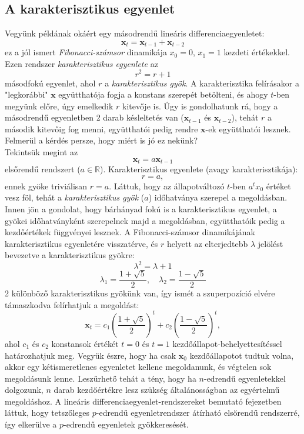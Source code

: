 \documentclass[14p]{article}
\begin{document}
\subsection{A karakterisztikus egyenlet}
Vegyünk példának okáért egy másodrendű lineáris differenciaegyenletet:
\[
	\pmb{x}_t = \pmb{x}_{t-1} + \pmb{x}_{t-2}
\]
ez a jól ismert \emph{Fibonacci-számsor} dinamikája $x_0 = 0$, $x_1 = 1$ kezdeti értékekkel.
Ezen rendszer \emph{karakterisztikus egyenlete} az
\[
	r^2 = r + 1
\]
másodfokú egyenlet, ahol $r$ a \emph{karakterisztikus gyök}. A karakterisztika felírásakor a "legkorábbi" $\pmb{x}$ együtthatója fogja a konstans szerepét betölteni, és ahogy $t$-ben megyünk előre, úgy emelkedik $r$ kitevője is. Úgy is gondolhatunk rá, hogy a másodrendű egyenletben 2 darab késleltetés van ($\pmb{x}_{t-1}$ és $\pmb{x}_{t-2}$), tehát $r$ a második kitevőig fog menni, együtthatói pedig rendre $\pmb{x}$-ek együtthatói lesznek. Felmerül a kérdés persze, hogy miért is jó ez nekünk?
\\
Tekintsük megint az
\[
	\pmb{x}_t = a\pmb{x}_{t-1}
\]
elsőrendű rendszert ($a \in \mathbb{R}$). Karakterisztikus egyenlete (avagy karakterisztikája):
\[
	r = a,
\]
ennek gyöke triviálisan $r = a$. Láttuk, hogy az állapotváltozó $t$-ben $a^tx_0$ értéket vesz föl, tehát a \emph{karakterisztikus gyök} ($a$) időhatványa szerepel a megoldásban. Innen jön a gondolat, hogy bárhányad fokú is a karakterisztikus egyenlet, a gyökei időhatványként szerepelnek majd a megoldásban, együtthatóik pedig a kezdőértékek függvényei lesznek. A Fibonacci-számsor dinamikájának karakterisztikus egyenletére visszatérve, és $r$ helyett az elterjedtebb $\lambda$ jelölést bevezetve a karakterisztikus gyökre:
\[
	\lambda^2 = \lambda + 1
\]
\[
	\lambda_1 = \frac{1+\sqrt{5}}{2}, \quad \lambda_2 = \frac{1-\sqrt{5}}{2}
\]
2 különböző karakterisztikus gyökünk van, így ismét a szuperpozíció elvére támaszkodva felírhatjuk a megoldást:
\[
	\pmb{x}_t = c_1(\frac{1+\sqrt{5}}{2})^{t} + c_2(\frac{1-\sqrt{5}}{2})^{t},
\]
ahol $c_1$ és $c_2$ konstansok értékét $t=0$ és $t=1$ kezdőállapot-behelyettesítéssel határozhatjuk meg. Vegyük észre, hogy ha csak $\pmb{x}_0$ kezdőállapotot tudtuk volna, akkor egy kétismeretlenes egyenletet kellene megoldanunk, és végtelen sok megoldásunk lenne. Leszűrhető tehát a tény, hogy ha $n$-edrendű egyenletekkel dolgozunk, $n$ darab kezdőértékre lesz szükség általánosságban az egyértelmű megoldáshoz. A lineáris differenciaegyenlet-rendszereket bemutató fejezetben láttuk, hogy tetszőleges $p$-edrendű egyenletrendszer átírható elsőrendű rendszerré, így elkerülve a $p$-edrendű egyenletek gyökkeresését.
\end{document}
